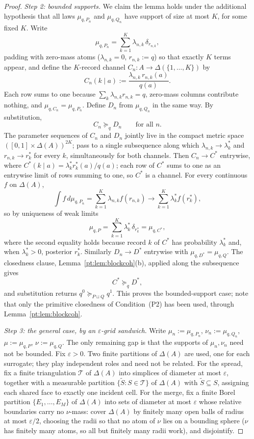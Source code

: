 \documentclass[11pt,a4paper]{article}
\theoremstyle{definition}
\newcommand{\1}{\mathbf 1}
\begin{document}
\begin{proof}
\emph{Step 2: bounded supports.}
We claim the lemma holds under the additional hypothesis that all laws $\mu_{q,P_n}$ and $\mu_{q,Q_n}$ have support of
size at most $K$, for some fixed $K$.  Write
\[
\mu_{q,P_n}=\sum_{k=1}^{K}\lambda_{n,k}\,\delta_{r_{n,k}},
\]
padding with zero-mass atoms ($\lambda_{n,k}=0$, $r_{n,k}:=q$) so that exactly $K$ terms appear, and define the
$K$-record channel $C_n:A\to\Delta(\{1,\dots,K\})$ by
\[
C_n(k\mid a):=\frac{\lambda_{n,k}\,r_{n,k}(a)}{q(a)}.
\]
Each row sums to one because $\sum_k\lambda_{n,k}r_{n,k}=q$, zero-mass columns contribute nothing, and
$\mu_{q,C_n}=\mu_{q,P_n}$.  Define $D_n$ from $\mu_{q,Q_n}$ in the same way.  By substitution,
\[
C_n\succeq_q D_n
\qquad\text{for all }n.
\]
The parameter sequences of $C_n$ and $D_n$ jointly live in the compact metric space
$([0,1]\times\Delta(A))^{2K}$; pass to a single subsequence along which $\lambda_{n,k}\to\lambda_k^\ast$ and
$r_{n,k}\to r_k^\ast$ for every $k$, simultaneously for both channels.  Then $C_n\to C^\ast$ entrywise, where
$C^\ast(k\mid a)=\lambda_k^\ast r_k^\ast(a)/q(a)$; each row of $C^\ast$ sums to one as an entrywise limit of rows
summing to one, so $C^\ast$ is a channel.  For every continuous $f$ on $\Delta(A)$,
\[
\int f\,d\mu_{q,P_n}
=
\sum_{k=1}^{K}\lambda_{n,k}f(r_{n,k})
\longrightarrow
\sum_{k=1}^{K}\lambda_k^\ast f(r_k^\ast),
\]
so by uniqueness of weak limits
\[
\mu_{q,P}=\sum_{k=1}^{K}\lambda_k^\ast\,\delta_{r_k^\ast}
=\mu_{q,C^\ast},
\]
where the second equality holds because record $k$ of $C^\ast$ has probability $\lambda_k^\ast$ and, when
$\lambda_k^\ast>0$, posterior $r_k^\ast$.  Similarly $D_n\to D^\ast$ entrywise with
$\mu_{q,D^\ast}=\mu_{q,Q}$.  The closedness clause, Lemma~\ref{pt:lem:blockcoh}(b), applied along the subsequence gives
\[
C^\ast\succeq_q D^\ast,
\]
and substitution returns $q^0\succeq_{P\sqcup Q}q^1$.  This proves the bounded-support case; note that only the
primitive closedness of Condition~\textup{(P2)} has been used, through Lemma~\ref{pt:lem:blockcoh}.

\emph{Step 3: the general case, by an $\varepsilon$-grid sandwich.}
Write $\mu_n:=\mu_{q,P_n}$, $\nu_n:=\mu_{q,Q_n}$, $\mu:=\mu_{q,P}$, $\nu:=\mu_{q,Q}$.  The only remaining gap is that
the supports of $\mu_n,\nu_n$ need not be bounded.  Fix $\varepsilon>0$.  Two finite partitions of $\Delta(A)$ are
used, one for each surrogate; they play independent roles and need not be related.  For the spread, fix a finite
triangulation $\mathcal T$ of $\Delta(A)$ into simplices of diameter at most $\varepsilon$, together with a measurable
partition $\{\widetilde S:S\in\mathcal T\}$ of $\Delta(A)$ with $\widetilde S\subseteq S$, assigning each shared face
to exactly one incident cell.  For the merge, fix a finite Borel partition $\{E_1,\dots,E_M\}$ of $\Delta(A)$ into
sets of diameter at most $\varepsilon$ whose relative boundaries carry no $\nu$-mass: cover $\Delta(A)$ by finitely
many open balls of radius at most $\varepsilon/2$, choosing the radii so that no atom of $\nu$ lies on a bounding
sphere ($\nu$ has finitely many atoms, so all but finitely many radii work), and disjointify.


\end{proof}
\end{document}
